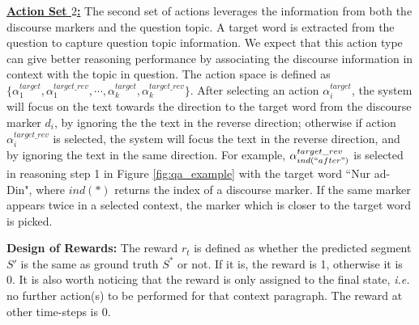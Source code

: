  {\bf{\underline{Action Set $2$:}}} The second set of actions leverages the information from both the discourse markers and the question topic. A target word is extracted from the question to capture question topic information. %
 We expect that this action type can give better reasoning performance by associating the discourse information in context with the topic in question. The action space is defined as $\lbrace\alpha_{1}^{target},\alpha_{1}^{target\_{rev}}, \cdots,\alpha_{k}^{target},\alpha_{k}^{target\_{rev}}\rbrace$. After selecting an action $\alpha_i^{target}$, the system will focus on the text towards the direction to the target word from the discourse marker $d_i$, by ignoring the the text in the reverse direction; otherwise if action $\alpha_i^{target\_{rev}}$ is selected, the system will focus the text in the reverse direction, and by ignoring the text in the same direction. For example, $\alpha_{ind(``after")}^{target\_{rev}}$ is selected in reasoning step 1 in Figure \ref{fig:qa_example} with the target word ``Nur ad-Din", where $ind(*)$ returns the index of a discourse marker.  If the same marker appears twice in a  selected context, the marker which is closer to the target word is picked.

 
\textbf{Design of Rewards:} 
The reward $r_t$ is defined as whether the predicted segment $S'$ is the same as ground truth $S^*$ or not.
If it is, the reward is 1, otherwise it is 0. It is also worth noticing that the reward is only assigned to the final state, \emph{i.e.} no further action(s) to be performed for that context paragraph. The reward at other time-steps is 0.


